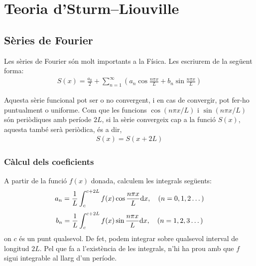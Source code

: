 \section{Teoria d'Sturm--Liouville}
\subsection{Sèries de Fourier}
\begin{defi}
    Les sèries de Fourier són molt importants a la Física. Les escriurem de la següent forma:
    \begin{align}
        S(x) = \frac{a_{0}}{2} + \sum\limits_{n=1}^{\infty} \left( a_{n} \cos \frac{n \pi x}{L} + b_{n} \sin \frac{n \pi x}{L} \right)
    \end{align}
\end{defi}
Aquesta sèrie funcional pot ser o no convergent, i en cas de convergir, pot fer-ho puntualment o uniforme. Com que les funcions $\cos (n \pi x / L)$ i $\sin (n \pi x / L)$ són periòdiques amb període $2L$, si la sèrie convergeix cap a la funció $S(x)$, aquesta també serà periòdica, és a dir,
\begin{align}
    S(x) = S(x + 2L)
\end{align}

\subsubsection*{Càlcul dels coeficients}
A partir de la funció $f(x)$ donada, calculem les integrals següents:
\begin{align}
    a_{n} = \frac{1}{L} \int_{c}^{c+2L} f(x) \cos \frac{n \pi x}{L} \mathrm{d} x , \quad (n = 0, 1, 2 \dots)
\end{align}
\begin{align}
    b_{n} = \frac{1}{L} \int_{c}^{c+2L} f(x) \sin \frac{n \pi x}{L} \mathrm{d} x , \quad (n = 1, 2, 3 \dots)
\end{align}
on $c$ és un punt qualsevol. De fet, podem integrar sobre qualsevol interval de longitud $2L$. Pel que fa a l'existència de les integrals, n'hi ha prou amb que $f$ sigui integrable al llarg d'un període.

